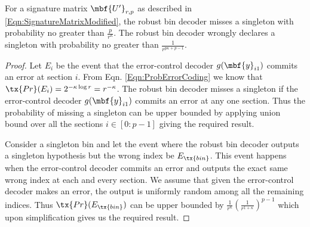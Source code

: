 \documentclass[conference,twocolumn]{IEEEtran}
\begin{document}
\begin{lemma}
\label{Lem:RobustBinAnalysis}
For a signature matrix $\mbf{U'}_{r,p}$ as described in \eqref{Eqn:SignatureMatrixModified}, the robust bin decoder misses a singleton with probability no greater than $\frac{p}{r^{\kappa}}$. The robust bin decoder wrongly declares a singleton with probability no greater than $\frac{1}{r^{p\kappa +p-1}}$.
\end{lemma}
\begin{proof}
Let $E_i$ be the event that the error-control decoder $g(\mbf{y}_{i1})$ commits an error at section $i$. From Eqn. \eqref{Eqn:ProbErrorCoding} we know that $\tx{Pr}(E_i)=2^{-\kappa \log r}=r^{-\kappa}$.
The robust bin decoder misses a singleton if the error-control decoder $g(\mbf{y}_{i1})$ commits an error at any one section. Thus the probability of missing a singleton can be upper bounded by applying union bound over all the sections $i\in[0:p-1]$ giving the required result. 

Consider a singleton bin and let the event where the robust bin decoder outputs a singleton hypothesis but the wrong index be $E_\tx{bin}$. This event happens when the error-control decoder commits an error and outputs the exact same wrong index at each and every section. We assume that given the error-control decoder makes an error, the output is uniformly random among all the remaining indices. Thus $\tx{Pr}(E_\tx{bin})$ can be upper bounded by $\frac{1}{r^\kappa} (\frac{1}{r^{1+\kappa}})^{p-1}$ which upon simplification gives us the required result.
\end{proof}
\end{document}
